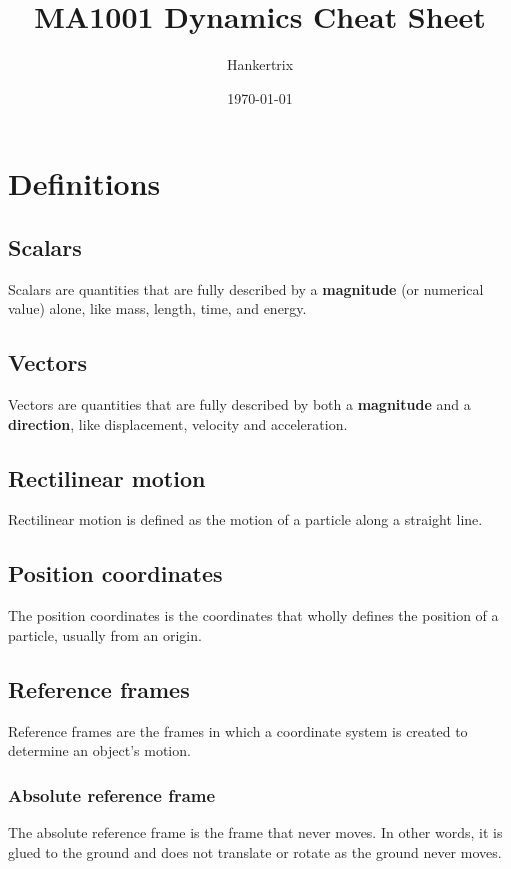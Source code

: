 \documentclass[11pt]{article}
\author{Hankertrix}
\date{\today}
\title{MA1001 Dynamics Cheat Sheet}
\begin{document}
\maketitle
\setcounter{tocdepth}{2}
\tableofcontents \clearpage
\section{Definitions}
\label{sec:orgf8e7da4}

\subsection{Scalars}
\label{sec:org70d8fc7}
Scalars are quantities that are fully described by a \textbf{magnitude} (or numerical value) alone, like mass, length, time, and energy.

\subsection{Vectors}
\label{sec:org7988219}
Vectors are quantities that are fully described by both a \textbf{magnitude} and a \textbf{direction}, like displacement, velocity and acceleration.

\subsection{Rectilinear motion}
\label{sec:org4fdc5ce}
Rectilinear motion is defined as the motion of a particle along a straight line.

\subsection{Position coordinates}
\label{sec:orgc63e0c6}
The position coordinates is the coordinates that wholly defines the position of a particle, usually from an origin.

\subsection{Reference frames}
\label{sec:orgfe21654}
Reference frames are the frames in which a coordinate system is created to determine an object's motion.

\subsubsection{Absolute reference frame}
\label{sec:org13d2412}
The absolute reference frame is the frame that never moves. In other words, it is glued to the ground and does not translate or rotate as the ground never moves.
\end{document}
